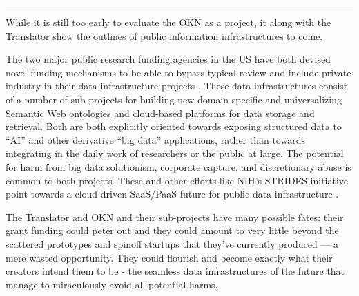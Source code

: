 \begin{center}\rule{0.5\linewidth}{0.5pt}\end{center}

While it is still too early to evaluate the OKN as a project, it along
with the Translator show the outlines of public information
infrastructures to come.

The two major public research funding agencies in the US have both
devised novel funding mechanisms to be able to bypass typical review and
include private industry in their data infrastructure projects \cite{consortiumBiomedicalDataTranslator2019, nationalsciencefoundationNSFConvergenceAccelerator2019} . These data
infrastructures consist of a number of sub-projects for building new
domain-specific and universalizing Semantic Web ontologies and
cloud-based platforms for data storage and retrieval. Both are both
explicitly oriented towards exposing structured data to ``AI'' and other
derivative ``big data'' applications, rather than towards integrating in
the daily work of researchers or the public at large. The potential for
harm from big data solutionism, corporate capture, and discretionary
abuse is common to both projects. These and other efforts like NIH's STRIDES initiative point towards a
cloud-driven SaaS/PaaS future for public data infrastructure \cite{nationalinstitutesofhealthSTRIDESInitiative2021} .

The Translator and OKN and their sub-projects have many possible fates:
their grant funding could peter out and they could amount to very little
beyond the scattered prototypes and spinoff startups that they've
currently produced --- a mere wasted opportunity. They could flourish
and become exactly what their creators intend them to be - the seamless
data infrastructures of the future that manage to miraculously avoid all
potential harms.

